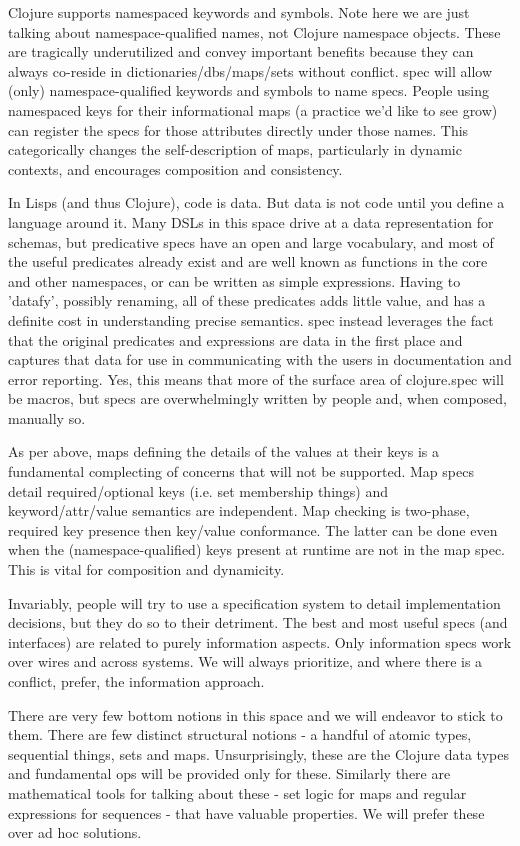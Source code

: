 Clojure supports namespaced keywords and symbols. Note here we are just talking
about namespace-qualified names, not Clojure namespace objects. These are
tragically underutilized and convey important benefits because they can always
co-reside in dictionaries/dbs/maps/sets without conflict. spec will allow (only)
namespace-qualified keywords and symbols to name specs. People using namespaced
keys for their informational maps (a practice we’d like to see grow) can
register the specs for those attributes directly under those names. This
categorically changes the self-description of maps, particularly in dynamic
contexts, and encourages composition and consistency.

In Lisps (and thus Clojure), code is data. But data is not code until you define
a language around it. Many DSLs in this space drive at a data representation for
schemas, but predicative specs have an open and large vocabulary, and most of
the useful predicates already exist and are well known as functions in the core
and other namespaces, or can be written as simple expressions. Having to
'datafy', possibly renaming, all of these predicates adds little value, and has
a definite cost in understanding precise semantics. spec instead leverages the
fact that the original predicates and expressions are data in the first place
and captures that data for use in communicating with the users in documentation
and error reporting. Yes, this means that more of the surface area of
clojure.spec will be macros, but specs are overwhelmingly written by people and,
when composed, manually so.

As per above, maps defining the details of the values at their keys is a
fundamental complecting of concerns that will not be supported. Map specs detail
required/optional keys (i.e. set membership things) and keyword/attr/value
semantics are independent. Map checking is two-phase, required key presence then
key/value conformance. The latter can be done even when the
(namespace-qualified) keys present at runtime are not in the map spec. This is
vital for composition and dynamicity.


Invariably, people will try to use a specification system to detail
implementation decisions, but they do so to their detriment. The best and most
useful specs (and interfaces) are related to purely information aspects. Only
information specs work over wires and across systems. We will always prioritize,
and where there is a conflict, prefer, the information approach.

There are very few bottom notions in this space and we will endeavor to stick to
them. There are few distinct structural notions - a handful of atomic types,
sequential things, sets and maps. Unsurprisingly, these are the Clojure data
types and fundamental ops will be provided only for these. Similarly there are
mathematical tools for talking about these - set logic for maps and regular
expressions for sequences - that have valuable properties. We will prefer these
over ad hoc solutions.


